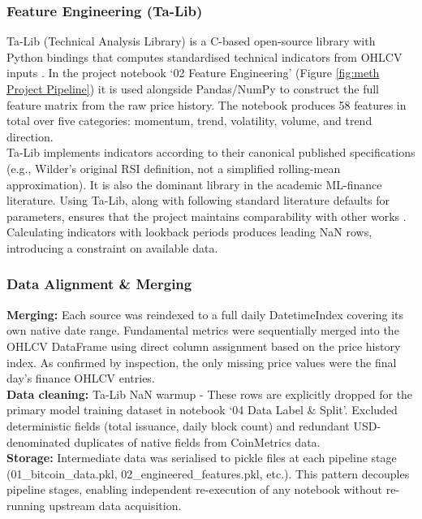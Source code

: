 \subsubsection{Feature Engineering (Ta-Lib)}
\label{subsubsec: Feature Engineering}
Ta-Lib (Technical Analysis Library) is a C-based open-source library with Python bindings that computes standardised technical indicators from OHLCV inputs \cite{TALibTechnicalAnalysis}. In the project notebook ‘02 Feature Engineering’ (Figure \ref{fig:meth Project Pipeline}) it is used alongside Pandas/NumPy to construct the full feature matrix from the raw price history. The notebook produces 58 features in total over five categories: momentum, trend, volatility, volume, and trend direction.\\
\noindent Ta-Lib implements indicators according to their canonical published specifications (e.g., Wilder's original RSI definition, not a simplified rolling-mean approximation). It is also the dominant library in the academic ML-finance literature. Using Ta-Lib, along with following standard literature defaults for parameters, ensures that the project maintains comparability with other works \cite{radmandHybridTLBOXGBoost2025, shangSentimentDrivenBitcoinPrice2025, tummonTradingCryptocurrencyDeep2020}. Calculating indicators with lookback periods produces leading NaN rows, introducing a constraint on available data. 
\subsubsection{Data Alignment \& Merging}
\label{subsubsec: Data Alignment \& Merging}
\textbf{Merging:} Each source was reindexed to a full daily DatetimeIndex covering its own native date range. Fundamental metrics were sequentially merged into the OHLCV DataFrame using direct column assignment based on the price history index. As confirmed by inspection, the only missing price values were the final day's finance OHLCV entries.\\
\noindent \textbf{Data cleaning:} Ta-Lib NaN warmup - These rows are explicitly dropped for the primary model training dataset in notebook ‘04 Data Label \& Split’. Excluded deterministic fields (total issuance, daily block count) and redundant USD-denominated duplicates of native fields from CoinMetrics data.\\
\textbf{Storage:} Intermediate data was serialised to pickle files at each pipeline stage (01\_bitcoin\_data.pkl, 02\_engineered\_features.pkl, etc.). This pattern decouples pipeline stages, enabling independent re-execution of any notebook without re-running upstream data acquisition.
